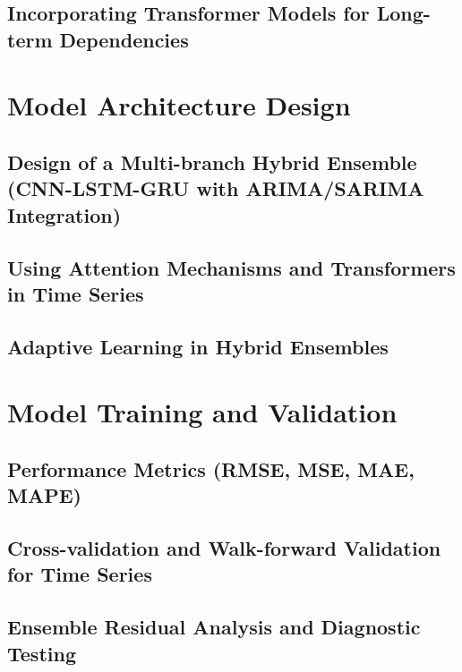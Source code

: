 \subsection{Incorporating Transformer Models for Long-term Dependencies} %

\section{Model Architecture Design} %
\subsection{Design of a Multi-branch Hybrid Ensemble (CNN-LSTM-GRU with ARIMA/SARIMA Integration)} %

\subsection{Using Attention Mechanisms and Transformers in Time Series} %

\subsection{Adaptive Learning in Hybrid Ensembles} %

\section{Model Training and Validation} %
\subsection{Performance Metrics (RMSE, MSE, MAE, MAPE)} %

\subsection{Cross-validation and Walk-forward Validation for Time Series} %

\subsection{Ensemble Residual Analysis and Diagnostic Testing} %
